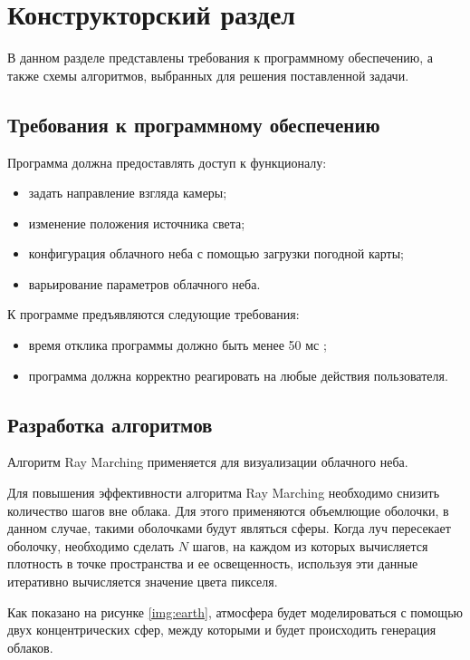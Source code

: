 \chapter{Конструкторский раздел}

В данном разделе представлены требования к программному обеспечению, а также схемы алгоритмов, выбранных для решения поставленной
задачи.

\section{Требования к программному обеспечению}
Программа должна предоставлять доступ к функционалу:
\begin{itemize}
	\item задать направление взгляда камеры;
	\item изменение положения источника света;
	\item конфигурация облачного неба с помощью загрузки погодной карты;
	\item варьирование параметров облачного неба.
\end{itemize}

К программе предъявляются следующие требования:
\begin{itemize}
	\item время отклика программы должно быть менее 50 мс \cite{hzd};
	\item программа должна корректно реагировать на любые действия пользователя.
\end{itemize}

\section{Разработка алгоритмов}

Алгоритм Ray Marching применяется для визуализации облачного неба. 

Для повышения эффективности алгоритма Ray Marching необходимо снизить количество шагов вне облака. Для этого применяются объемлющие оболочки, в данном случае, такими оболочками будут являться сферы. Когда луч пересекает оболочку, необходимо сделать $ N $ шагов, на каждом из которых вычисляется плотность в точке пространства и ее освещенность, используя эти данные итеративно вычисляется значение цвета пикселя. 

Как показано на рисунке \ref{img:earth}, атмосфера будет моделироваться с помощью двух концентрических сфер, между которыми и будет происходить генерация облаков.

